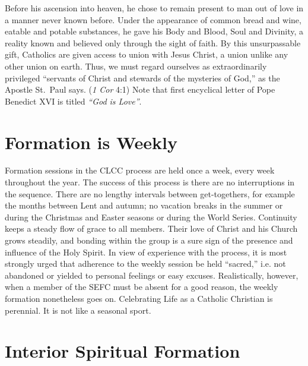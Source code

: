 \documentclass{article}
\begin{document}
Before his ascension into heaven, he chose to remain present to man out of love
in a manner never known before. Under the appearance of common bread and wine,
eatable and potable substances, he gave his Body and Blood, Soul and Divinity, a
reality known and believed only through the sight of faith. By this
unsurpassable gift, Catholics are given access to union with Jesus Christ, a
union unlike any other union on earth. Thus, we must regard ourselves as
extraordinarily privileged ``servants of Christ and stewards of the mysteries of
God,'' as the Apostle St.\ Paul says. (\emph{1 Cor} 4:1) Note that first
encyclical letter of Pope Benedict XVI is titled \emph{``God is Love''}.


\section{Formation is Weekly}

Formation sessions in the CLCC process are held once a week, every week
throughout the year. The success of this process is there are no interruptions
in the sequence. There are no lengthy intervals between get-togethers, for
example the months between Lent and autumn; no vacation breaks in the summer or
during the Christmas and Easter seasons or during the World Series. Continuity
keeps a steady flow of grace to all members. Their love of Christ and his Church
grows steadily, and bonding within the group is a sure sign of the presence and
influence of the Holy Spirit. In view of experience with the process, it is most
strongly urged that adherence to the weekly session be held ``sacred,'' i.e. not
abandoned or yielded to personal feelings or easy excuses. Realistically,
however, when a member of the SEFC must be absent for a good reason, the weekly
formation nonetheless goes on. Celebrating Life as a Catholic Christian is
perennial. It is not like a seasonal sport.


\section{Interior Spiritual Formation}
\end{document}
